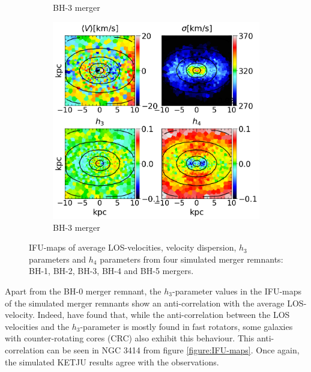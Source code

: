 \documentclass[english, oneside]{HYgradu}
\begin{document}
\begin{figure}
\begin{subfigure}[b]{0.49\textwidth}
		\caption{BH-3 merger}
	\end{subfigure}
	\begin{subfigure}[b]{0.49\textwidth}
		\includegraphics[width=\textwidth]{BH_5.png}
		\caption{BH-3 merger}
	\end{subfigure}
	\caption{IFU-maps of average LOS-velocities, velocity dispersion, $h_3$ parameters and $h_4$ parameters from four simulated merger remnants: BH-1, BH-2, BH-3, BH-4 and BH-5 mergers.}
	\label{figure:rest_of_voronoi}
\end{figure}



Apart from the BH-0 merger remnant, the $h_3$-parameter values in the IFU-maps of the simulated merger remnants show an anti-correlation with the average LOS-velocity. Indeed, \cite{Krajnovic2011} have found that, while the anti-correlation between the LOS velocities and the $h_3$-parameter is mostly found in fast rotators, some galaxies with counter-rotating cores (CRC) also exhibit this behaviour. This anti-correlation can be seen in NGC 3414 from figure \ref{figure:IFU-maps}. Once again, the simulated KETJU results agree with the observations.
\end{document}
